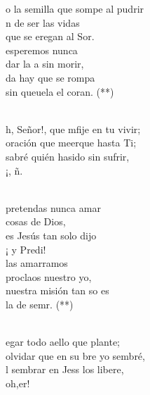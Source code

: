 \documentclass[12pt]{article}
\begin{document}
\begin{multicols*}{2}
\begin{cancion}%
	o la semilla que sompe al pudrir\\
	n de ser las vidas \\
	que se eregan al Sor.\\
	esperemos nunca \\
	dar la a sin morir,\\
	da hay que se rompa \\
	sin queuela el coran. (**)\\\jump\\
	\begin{chorus}%
	h, Señor!, que mfije en tu vivir;\\
	 oración que meerque hasta Ti;\\
	sabré quién hasido sin sufrir, \\
	¡, ñ. \\
	\end{chorus}%
	\jump\\
	pretendas nunca amar \\
cosas de Dios,\\
	es Jesús tan solo dijo\\
	¡ y Predi! \\
	las amarramos \\
	proclaos nuestro yo,\\
	nuestra misión tan so es \\
	la de semr. (**)\\\jump\\
	\begin{chorus}%
	egar todo aello que plante;\\
	 olvidar que en su bre yo sembré,\\
	l sembrar en Jess los libere, \\
	oh,er!\\
	\end{chorus}%
	\jump\\
\end{cancion}%


\end{multicols*}
\end{document}
